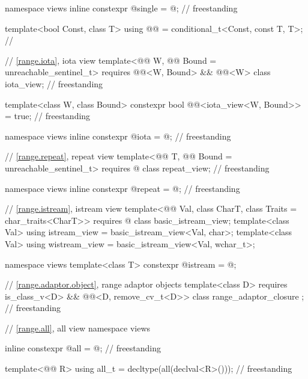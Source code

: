 \begin{codeblock}
{  namespace views { inline constexpr @\unspecnc@ single = @\unspecnc@; }            // freestanding

  template<bool Const, class T>
    using @@ = conditional_t<Const, const T, T>;   // \expos

  // \ref{range.iota}, iota view
  template<@@ W, @@ Bound = unreachable_sentinel_t>
    requires @@<W, Bound> && @@<W>
  class iota_view;                                                                  // freestanding

  template<class W, class Bound>
    constexpr bool @@<iota_view<W, Bound>> = true;               // freestanding

  namespace views { inline constexpr @\unspecnc@ iota = @\unspecnc@; }              // freestanding

  // \ref{range.repeat}, repeat view
  template<@@ T, @@ Bound = unreachable_sentinel_t>
    requires @\seebelow@
  class repeat_view;                                                                // freestanding

  namespace views { inline constexpr @\unspecnc@ repeat = @\unspecnc@; }            // freestanding

  // \ref{range.istream}, istream view
  template<@@ Val, class CharT, class Traits = char_traits<CharT>>
    requires @\seebelow@
  class basic_istream_view;
  template<class Val>
    using istream_view = basic_istream_view<Val, char>;
  template<class Val>
    using wistream_view = basic_istream_view<Val, wchar_t>;

  namespace views { template<class T> constexpr @\unspecnc@ istream = @\unspecnc@; }

  // \ref{range.adaptor.object}, range adaptor objects
  template<class D>
    requires is_class_v<D> && @@<D, remove_cv_t<D>>
  class range_adaptor_closure { };                                                  // freestanding

  // \ref{range.all}, all view
  namespace views {
    inline constexpr @\unspecnc@ all = @\unspecnc@;                                 // freestanding

    template<@@ R>
      using all_t = decltype(all(declval<R>()));                                    // freestanding
  }

}
\end{codeblock}
